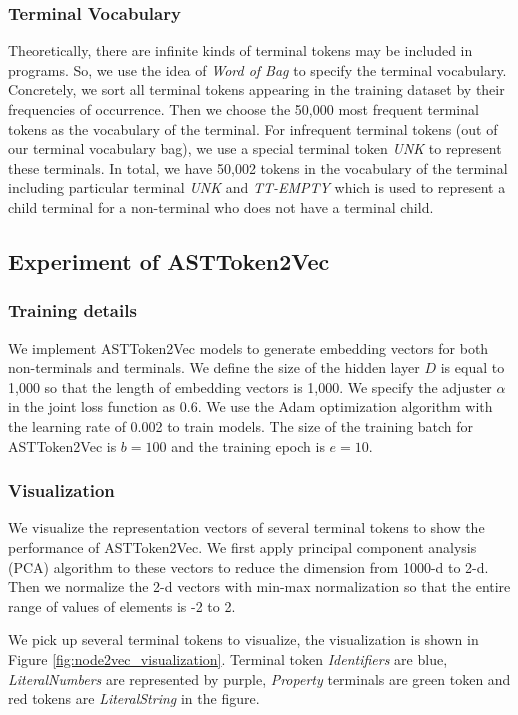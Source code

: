\documentclass[T, E]{compsoft}
\begin{document}
\subsubsection{Terminal Vocabulary} 
Theoretically, there are infinite kinds of terminal tokens may be included in programs.
So, we use the idea of \textit{Word of Bag} to specify the terminal vocabulary. 
Concretely, we sort all terminal tokens appearing in the training dataset by their frequencies of occurrence. 
Then we choose the 50,000 most frequent terminal tokens as the vocabulary of the terminal. 
For infrequent terminal tokens (out of our terminal vocabulary bag), we use a special terminal token \textit{UNK} to represent these terminals. 
In total, we have 50,002 tokens in the vocabulary of the terminal including particular terminal \textit{UNK} and \textit{TT-EMPTY} which is used to represent a child terminal for a non-terminal who does not have a terminal child. 



\subsection{Experiment of ASTToken2Vec}
\subsubsection{Training details}
We implement ASTToken2Vec models to generate embedding vectors for both non-terminals and terminals. We define the size of the hidden layer $D$ is equal to 1,000 so that the length of embedding vectors is 1,000. 
We specify the adjuster $\alpha$ in the joint loss function as 0.6.
We use the Adam optimization algorithm with the learning rate of 0.002 to train models. 
The size of the training batch for ASTToken2Vec is $b=100$ and the training epoch is $e=10$.

\subsubsection{Visualization}
We visualize the representation vectors of several terminal tokens to show the performance of ASTToken2Vec.
We first apply principal component analysis (PCA) algorithm to these vectors to reduce the dimension from 1000-d to 2-d. 
Then we normalize the 2-d vectors with min-max normalization so that the entire range of values of elements is -2 to 2.

We pick up several terminal tokens to visualize, the visualization is shown in Figure \ref{fig:node2vec_visualization}. 
Terminal token \textit{Identifiers} are blue, \textit{LiteralNumbers} are represented by purple, \textit{Property} terminals are green token and red tokens are \textit{LiteralString} in the figure.
\end{document}
